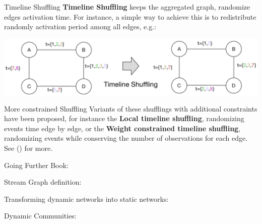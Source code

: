 \documentclass[a4paper,11pt]{book}
\begin{document}
\begin{textbox}{Timeline Shuffling}
\textbf{Timeline Shuffling} keeps the aggregated graph, randomize edges activation time. For instance, a simple way to achieve this is to redistribute randomly activation period among all edges, e.g.: 
   
 
 
\centering

\colorbox{white}{\includegraphics[width=0.9\linewidth]{pics/dynamic/timeline-shuffling.pdf}}
 
\end{textbox}

\begin{textbox}{More constrained Shuffling}
Variants of these shufflings with additional constraints have been proposed, for instance the \textbf{Local timeline shuffling}, randomizing events time edge by edge, or the \textbf{Weight constrained timeline shuffling}, randomizing events while conserving the number of observations for each edge. See (\cite{gauvin2022}) for more.
 
 
\centering

 
\end{textbox}


\begin{textbox}{Going Further}
Book: \cite{holme2019temporal}

Stream Graph definition: \cite{latapy2018stream}

Transforming dynamic networks into static networks:  \cite{kivela2018mapping}

Dynamic Communities: \cite{rossetti2018community}

\end{textbox}

\end{document}
